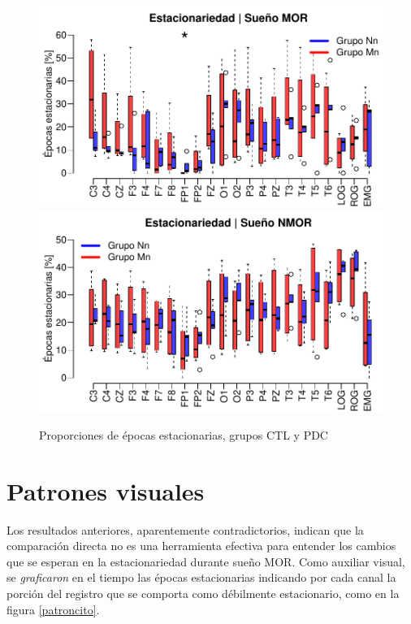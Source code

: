 \begin{figure}
\centering
\includegraphics[width=\linewidth]
{./img_ejemplos/Comparacion_gpos_MOR_v2.pdf} \\
\includegraphics[width=\linewidth]
{./img_ejemplos/Comparacion_gpos_NMOR_v2.pdf}
\caption{Proporciones de épocas estacionarias, grupos CTL y PDC}
\label{comparacion_graf}
\end{figure}


\section{Patrones visuales}

Los resultados anteriores, aparentemente contradictorios, indican que la comparación directa no es 
una herramienta efectiva para entender los cambios que se esperan en la estacionariedad durante
sueño MOR.
Como auxiliar visual, se \textit{graficaron} en el tiempo las épocas
estacionarias indicando por cada canal la porción del registro que se comporta como débilmente 
estacionario, como en la figura \ref{patroncito}.

